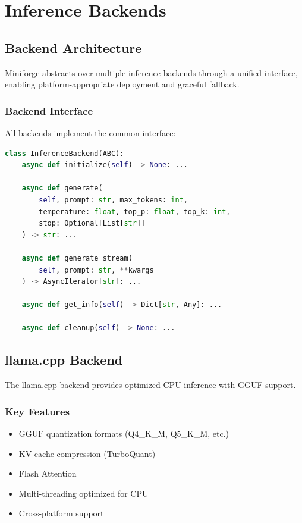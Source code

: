 \section{Inference Backends}
\label{sec:backends}

\subsection{Backend Architecture}

Miniforge abstracts over multiple inference backends through a unified interface, enabling platform-appropriate deployment and graceful fallback.

\subsubsection{Backend Interface}

All backends implement the common interface:

\begin{lstlisting}[language=Python, caption=Backend Interface]
class InferenceBackend(ABC):
    async def initialize(self) -> None: ...
    
    async def generate(
        self, prompt: str, max_tokens: int,
        temperature: float, top_p: float, top_k: int,
        stop: Optional[List[str]]
    ) -> str: ...
    
    async def generate_stream(
        self, prompt: str, **kwargs
    ) -> AsyncIterator[str]: ...
    
    async def get_info(self) -> Dict[str, Any]: ...
    
    async def cleanup(self) -> None: ...
\end{lstlisting}

\subsection{llama.cpp Backend}

The llama.cpp backend provides optimized CPU inference with GGUF support.

\subsubsection{Key Features}

\begin{itemize}
    \item GGUF quantization formats (Q4\_K\_M, Q5\_K\_M, etc.)
    \item KV cache compression (TurboQuant)
    \item Flash Attention
    \item Multi-threading optimized for CPU
    \item Cross-platform support
\end{itemize}

